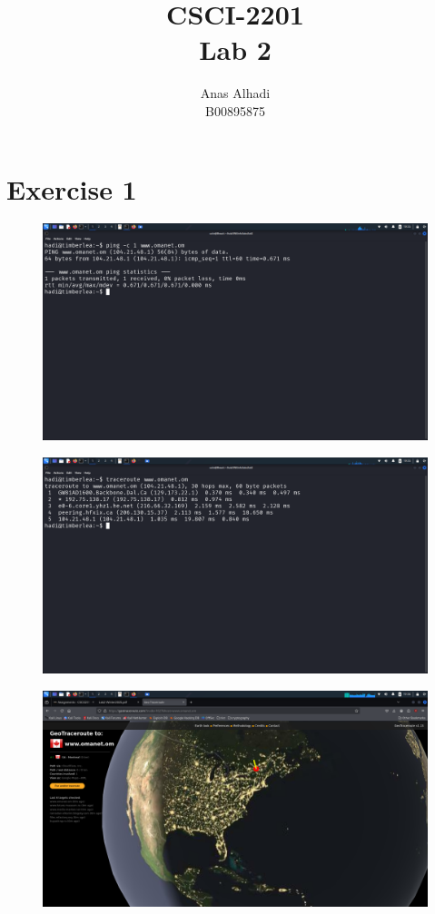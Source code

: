 \documentclass{article}
\title{\textbf{CSCI-2201\\Lab 2}}
\author{Anas Alhadi\\B00895875}
\numberwithin{equation}{subsection}
\begin{document}
	\maketitle
	\tableofcontents	
	\newpage

	\section{Exercise 1}
	\begin{figure}[H]
		\includegraphics[width=400pt]{pics/1.png}
	\end{figure}
	\begin{figure}[H]
		\includegraphics[width=400pt]{pics/2.png}
	\end{figure}
	\begin{figure}[H]
		\includegraphics[width=400pt]{pics/3.png}
	\end{figure}
\end{document}
